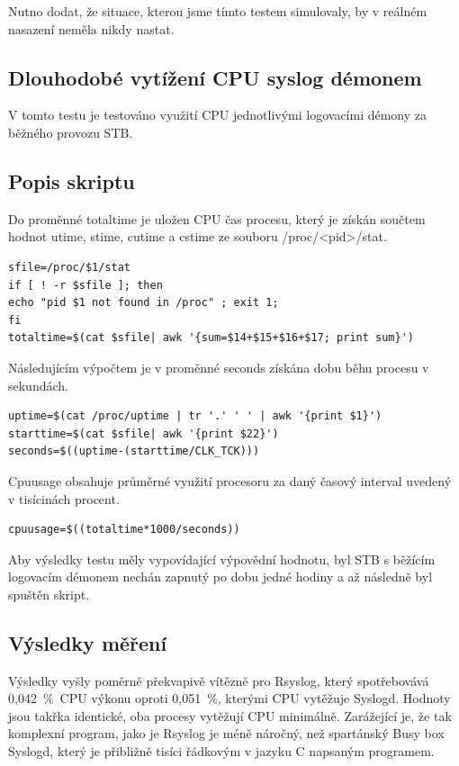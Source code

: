 \documentclass[thesis=B,czech]{FITthesis}[2012/06/26]
\begin{document}
Nutno dodat, že situace, kterou jsme tímto testem simulovaly, by v reálném nasazení neměla nikdy nastat.

\subsection{Dlouhodobé vytížení CPU syslog démonem}
V tomto testu je testováno využití CPU jednotlivými logovacími démony za běžného provozu STB.

\subsection*{Popis skriptu}
Do proměnné totaltime je uložen CPU čas procesu, který je získán součtem hodnot utime, stime, cutime a cstime ze souboru /proc/<pid>/stat.
\begin{lstlisting}[style=AshSimpleStyle]
sfile=/proc/$1/stat
if [ ! -r $sfile ]; then
echo "pid $1 not found in /proc" ; exit 1;
fi
totaltime=$(cat $sfile| awk '{sum=$14+$15+$16+$17; print sum}')
\end{lstlisting}
Následujícím výpočtem je v proměnné seconds získána dobu běhu procesu v sekundách.\begin{lstlisting}[style=AshSimpleStyle]
uptime=$(cat /proc/uptime | tr '.' ' ' | awk '{print $1}')
starttime=$(cat $sfile| awk '{print $22}')
seconds=$((uptime-(starttime/CLK_TCK)))
\end{lstlisting}
Cpuusage obsahuje průměrné využití procesoru za daný časový interval uvedený v tisícinách procent.
\begin{lstlisting}[style=AshSimpleStyle]
cpuusage=$((totaltime*1000/seconds))
\end{lstlisting}

Aby výsledky testu měly vypovídající výpovědní hodnotu, byl STB s běžícím logovacím démonem nechán zapnutý po dobu jedné hodiny a až následně byl spuštěn skript.

\subsection*{Výsledky měření}
Výsledky vyšly poměrně překvapivě vítězně pro Rsyslog, který spotřebovává 0,042~\%~CPU výkonu oproti 0,051~\%, kterými CPU vytěžuje Syslogd. Hodnoty jsou takřka identické, oba procesy vytěžují CPU minimálně. Zarážející je, že tak komplexní program, jako je Rsyslog je méně náročný, než spartánský Busy box Syslogd, který je přibližně tisíci řádkovým v jazyku C napsaným programem.
\end{document}
